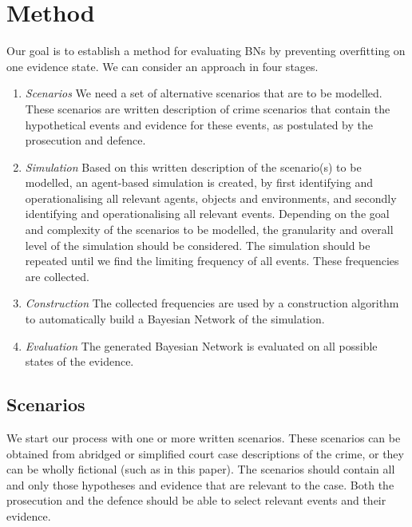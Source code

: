 \documentclass[12pt]{article}
\begin{document}
\newpage

\section{Method}

Our goal is to establish a method for evaluating BNs by preventing overfitting on one evidence state. We can consider an approach in four stages.

\begin{enumerate}
\item \emph{Scenarios} We need a set of alternative scenarios that are to be modelled. These scenarios are written description of crime scenarios that contain the hypothetical events and evidence for these events, as postulated by the prosecution and defence. 

\item  \emph{Simulation} Based on this written description of the scenario(s) to be modelled, an agent-based simulation is created, by first identifying and operationalising all relevant agents, objects and environments, and secondly identifying and operationalising all relevant events. Depending on the goal and complexity of the scenarios to be modelled, the granularity and overall level of the simulation should be considered. The simulation should be repeated until we find the limiting frequency of all events. These frequencies are collected.

\item  \emph{Construction} The collected frequencies are used by a construction algorithm to automatically build a Bayesian Network of the simulation. 

\item  \emph{Evaluation} The generated Bayesian Network is evaluated on all possible states of the evidence.

\end{enumerate}

\subsection{Scenarios}
We start our process with one or more written scenarios. These scenarios can be obtained from abridged or simplified court case descriptions of the crime, or they can be wholly fictional (such as in this paper). The scenarios should contain all and only those hypotheses and evidence that are relevant to the case. Both the prosecution and the defence should be able to select relevant events and their evidence. 
\end{document}
